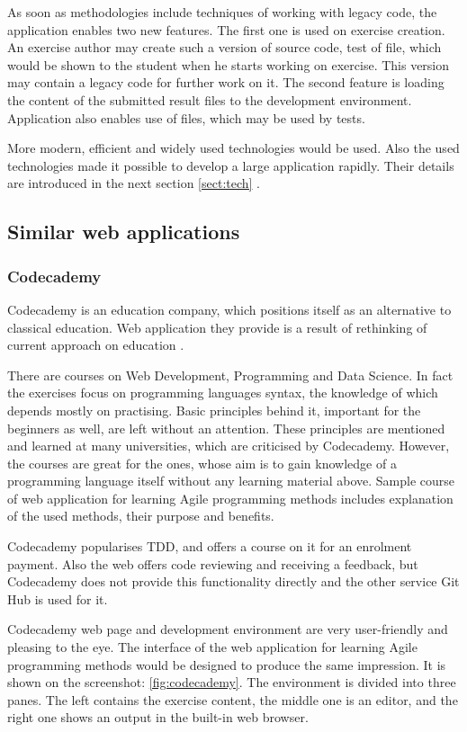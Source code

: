 As soon as methodologies include techniques of working with legacy code, the application enables two new features. The first one is used on exercise creation. An exercise author may create such a version of source code, test of file, which would be shown to the student when he starts working on exercise. This version may contain a legacy code for further work on it. The second feature is loading the content of the submitted result files to the development environment. Application also enables use of files, which may be used by tests.

More modern, efficient and widely used technologies would be used. Also the used technologies made it possible to develop a large application rapidly. Their details are introduced in the next section \ref{sect:tech} .

\subsection{Similar web applications}

\subsubsection{Codecademy}
Codecademy is an education company, which positions itself as an alternative to classical education. Web application they provide is a result of rethinking of current approach on education \cite[About]{codecademy}.

There are courses on Web Development, Programming and Data Science. In fact the exercises focus on programming languages syntax, the knowledge of which depends mostly on practising. Basic principles behind it, important for the beginners as well, are left without an attention. These principles are mentioned and learned at many universities, which are criticised by Codecademy. However, the courses are great for the ones, whose aim is to gain knowledge of a programming language itself without any learning material above. Sample course of web application for learning Agile programming methods includes explanation of the used methods, their purpose and benefits.

Codecademy popularises TDD, and offers a course on it for an enrolment payment. Also the web offers code reviewing and receiving a feedback, but Codecademy does not provide this functionality directly and the other service Git Hub is used for it.

Codecademy web page and development environment are very user-friendly and pleasing to the eye. The interface of the web application for learning Agile programming methods would be designed to produce the same impression. It is shown on the screenshot: \ref{fig:codecademy}. The environment is divided into three panes. The left contains the exercise content, the middle one is an editor, and the right one shows an output in the built-in web browser.

